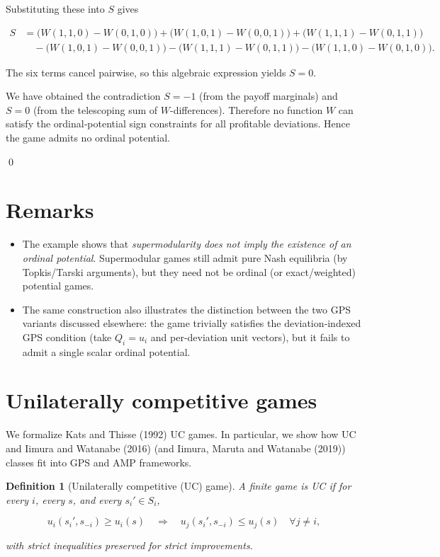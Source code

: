 \documentclass[11pt]{article}
\newtheorem{definition}[theorem]{Definition}
\begin{document}
Substituting these into \(S\) gives


\[
\begin{aligned}
S &= \big(W(1,1,0)-W(0,1,0)\big)
   +\big(W(1,0,1)-W(0,0,1)\big)
   +\big(W(1,1,1)-W(0,1,1)\big)\\
 &\quad -\big(W(1,0,1)-W(0,0,1)\big)
   -\big(W(1,1,1)-W(0,1,1)\big)
   -\big(W(1,1,0)-W(0,1,0)\big).
\end{aligned}
\]


The six terms cancel pairwise, so this algebraic expression yields \(S=0\).

We have obtained the contradiction \(S=-1\) (from the payoff marginals) and \(S=0\) (from the telescoping sum of \(W\)-differences). Therefore no function \(W\) can satisfy the ordinal‑potential sign constraints for all profitable deviations. Hence the game admits no ordinal potential.

\qed
\section*{Remarks}
\begin{itemize}
  \item The example shows that \emph{supermodularity does not imply the existence of an ordinal potential}. Supermodular games still admit pure Nash equilibria (by Topkis/Tarski arguments), but they need not be ordinal (or exact/weighted) potential games.
  \item The same construction also illustrates the distinction between the two GPS variants discussed elsewhere: the game trivially satisfies the deviation‑indexed GPS condition (take $Q_i=u_i$ and per‑deviation unit vectors), but it fails to admit a single scalar ordinal potential.
\end{itemize}
\section{Unilaterally competitive games}
We formalize Kats and Thisse (1992) UC games. In particular, we show how UC and Iimura and Watanabe (2016) (and Iimura, Maruta and Watanabe (2019)) classes fit into GPS
and AMP frameworks.

\begin{definition}[Unilaterally competitive (UC) game]
A finite game is UC if for every \(i\), every \(s\), and every \(s_i'\in S_i\),


\[
u_i(s_i',s_{-i})\ge u_i(s)\quad\Longrightarrow\quad u_j(s_i',s_{-i})\le u_j(s)\quad\forall j\ne i,
\]


with strict inequalities preserved for strict improvements.
\end{definition}
\end{document}
